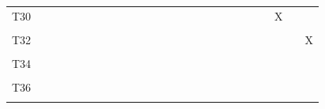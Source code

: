 \documentclass[
]{article}
\begin{document}
\begin{longtable}[l]{lllllllllllllllllllllllll}
T30 &  &  &  &  &  &  &  &  &  &  &  &  &  &  &  &  &  &  &  &  &  & X &  & \\
\addlinespace
\cellcolor{gray!6}{T31} & \cellcolor{gray!6}{} & \cellcolor{gray!6}{} & \cellcolor{gray!6}{} & \cellcolor{gray!6}{} & \cellcolor{gray!6}{} & \cellcolor{gray!6}{} & \cellcolor{gray!6}{} & \cellcolor{gray!6}{} & \cellcolor{gray!6}{} & \cellcolor{gray!6}{} & \cellcolor{gray!6}{} & \cellcolor{gray!6}{} & \cellcolor{gray!6}{} & \cellcolor{gray!6}{} & \cellcolor{gray!6}{} & \cellcolor{gray!6}{} & \cellcolor{gray!6}{} & \cellcolor{gray!6}{} & \cellcolor{gray!6}{} & \cellcolor{gray!6}{} & \cellcolor{gray!6}{} & \cellcolor{gray!6}{} & \cellcolor{gray!6}{X} & \cellcolor{gray!6}{}\\
T32 &  &  &  &  &  &  &  &  &  &  &  &  &  &  &  &  &  &  &  &  &  &  &  & X\\
\cellcolor{gray!6}{T33} & \cellcolor{gray!6}{} & \cellcolor{gray!6}{} & \cellcolor{gray!6}{} & \cellcolor{gray!6}{} & \cellcolor{gray!6}{} & \cellcolor{gray!6}{} & \cellcolor{gray!6}{} & \cellcolor{gray!6}{} & \cellcolor{gray!6}{} & \cellcolor{gray!6}{} & \cellcolor{gray!6}{} & \cellcolor{gray!6}{} & \cellcolor{gray!6}{} & \cellcolor{gray!6}{} & \cellcolor{gray!6}{} & \cellcolor{gray!6}{} & \cellcolor{gray!6}{} & \cellcolor{gray!6}{} & \cellcolor{gray!6}{} & \cellcolor{gray!6}{} & \cellcolor{gray!6}{} & \cellcolor{gray!6}{} & \cellcolor{gray!6}{} & \cellcolor{gray!6}{}\\
T34 &  &  &  &  &  &  &  &  &  &  &  &  &  &  &  &  &  &  &  &  &  &  &  & \\
\cellcolor{gray!6}{T35} & \cellcolor{gray!6}{} & \cellcolor{gray!6}{} & \cellcolor{gray!6}{} & \cellcolor{gray!6}{} & \cellcolor{gray!6}{} & \cellcolor{gray!6}{} & \cellcolor{gray!6}{} & \cellcolor{gray!6}{} & \cellcolor{gray!6}{} & \cellcolor{gray!6}{} & \cellcolor{gray!6}{} & \cellcolor{gray!6}{} & \cellcolor{gray!6}{} & \cellcolor{gray!6}{} & \cellcolor{gray!6}{} & \cellcolor{gray!6}{} & \cellcolor{gray!6}{} & \cellcolor{gray!6}{} & \cellcolor{gray!6}{} & \cellcolor{gray!6}{} & \cellcolor{gray!6}{} & \cellcolor{gray!6}{} & \cellcolor{gray!6}{} & \cellcolor{gray!6}{}\\
\addlinespace
T36 &  &  &  &  &  &  &  &  &  &  &  &  &  &  &  &  &  &  &  &  &  &  &  & \\
\cellcolor{gray!6}{T37} & \cellcolor{gray!6}{} & \cellcolor{gray!6}{} & \cellcolor{gray!6}{} & \cellcolor{gray!6}{} & \cellcolor{gray!6}{} & \cellcolor{gray!6}{} & \cellcolor{gray!6}{} & \cellcolor{gray!6}{} & \cellcolor{gray!6}{} & \cellcolor{gray!6}{} & \cellcolor{gray!6}{} & \cellcolor{gray!6}{} & \cellcolor{gray!6}{} & \cellcolor{gray!6}{} & \cellcolor{gray!6}{} & \cellcolor{gray!6}{} & \cellcolor{gray!6}{} & \cellcolor{gray!6}{} & \cellcolor{gray!6}{} & \cellcolor{gray!6}{} & \cellcolor{gray!6}{} & \cellcolor{gray!6}{} & \cellcolor{gray!6}{} & \cellcolor{gray!6}{}\\

\end{longtable}
\end{document}
